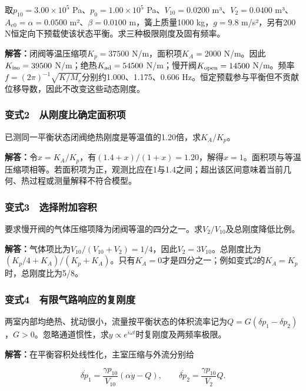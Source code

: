 \documentclass[12pt,a4paper,fontset=fandol]{ctexart}
\begin{document}
取\(p_{10}=3.00\times10^5\) Pa、\(p_0=1.00\times10^5\)
Pa、\(V_{10}=0.0200\) m³、\(V_2=0.0400\) m³、\(A_{e0}=\alpha=0.0500\)
m²、\(\beta=0.0100\) m，簧上质量1000 kg，\(g=9.8\) m/s²，另有200
N恒定向下预载使该状态平衡。求三种极限刚度及固有频率。

\textbf{解答：}闭阀等温压缩项\(K_p=37500\) N/m，面积项\(K_A=2000\)
N/m。因此\(K_{\rm iso}=39500\) N/m；绝热\(K_{\rm ad}=54500\)
N/m；慢开阀\(K_{\rm open}=14500\)
N/m。频率\(f=(2\pi)^{-1}\sqrt{K/M_s}\)分别约1.000、1.175、0.606
Hz。恒定预载参与平衡但不贡献位移导数，因此不改变这些动态刚度。

\subsubsection{变式2　从刚度比确定面积项}\label{ux53d8ux5f0f2-ux4eceux521aux5ea6ux6bd4ux786eux5b9aux9762ux79efux9879}

已测同一平衡状态闭阀绝热刚度是等温值的1.20倍，求\(K_A/K_p\)。

\textbf{解答：}令\(x=K_A/K_p\)，有\((1.4+x)/(1+x)=1.20\)，解得\(x=1\)。面积项与等温压缩项相等。若面积项为正，观测比应在1与1.4之间；超出该区间意味着当前几何、热过程或测量解释不符合模型。

\subsubsection{变式3　选择附加容积}\label{ux53d8ux5f0f3-ux9009ux62e9ux9644ux52a0ux5bb9ux79ef}

要求慢开阀的气体压缩项降为闭阀等温的四分之一。求\(V_2/V_{10}\)及总刚度降低比例。

\textbf{解答：}气体项比为\(V_{10}/(V_{10}+V_2)=1/4\)，因此\(V_2=3V_{10}\)。总刚度比为\((K_p/4+K_A)/(K_p+K_A)\)。只有\(K_A=0\)才是四分之一；例如变式2的\(K_A=K_p\)时，总刚度比为5/8。

\subsubsection{变式4　有限气路响应的复刚度}\label{ux53d8ux5f0f4-ux6709ux9650ux6c14ux8defux54cdux5e94ux7684ux590dux521aux5ea6}

两室内部均绝热、扰动很小，流量按平衡状态的体积流率记为\(Q=G(\delta p_1-\delta p_2)\)，\(G>0\)。忽略通道惯性，求\(y\propto e^{i\omega t}\)时复刚度及两频率极限。

\textbf{解答：}在平衡容积处线性化，主室压缩与外流分别给

\[
\dot{\delta p_1}
=\frac{\gamma p_{10}}{V_{10}}(\alpha\dot y-Q),
\qquad
\dot{\delta p_2}
=\frac{\gamma p_{10}}{V_2}Q.
\]
\end{document}
